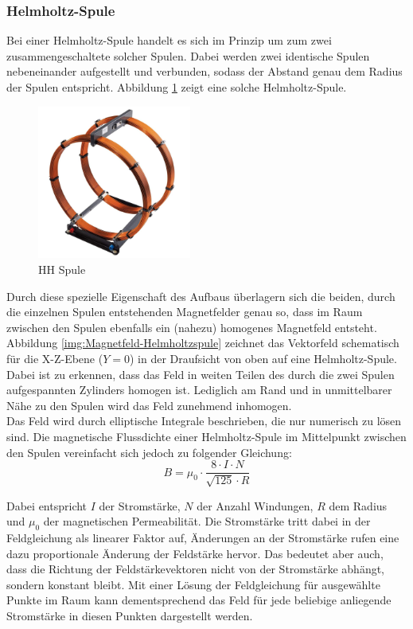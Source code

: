 \subsubsection{Helmholtz-Spule}
\label{sec-2-2-2}
Bei einer Helmholtz-Spule handelt es sich im Prinzip um zum zwei zusammengeschaltete solcher Spulen. Dabei werden zwei identische Spulen nebeneinander aufgestellt und verbunden, sodass der Abstand genau dem Radius der Spulen entspricht. Abbildung \ref{img:Helmholtz} zeigt eine solche Helmholtz-Spule.\\

\begin{figure}[h!]
	\centering
	\includegraphics[width=0.45\textwidth]{images/Helmholtz.jpg}
	\caption{HH Spule}
	\label{img:Helmholtz}
\end{figure}

Durch diese spezielle Eigenschaft des Aufbaus überlagern sich die beiden, durch die einzelnen Spulen entstehenden Magnetfelder genau so, dass im Raum zwischen den Spulen ebenfalls ein (nahezu) homogenes Magnetfeld entsteht. Abbildung \ref{img:Magnetfeld-Helmholtzspule} zeichnet das Vektorfeld schematisch für die X-Z-Ebene ($Y=0$) in der Draufsicht von oben auf eine Helmholtz-Spule. Dabei ist zu erkennen, dass das Feld in weiten Teilen des durch die zwei Spulen aufgespannten Zylinders homogen ist. Lediglich am Rand und in unmittelbarer Nähe zu den Spulen wird das Feld zunehmend inhomogen.\\

Das Feld wird durch elliptische Integrale beschrieben, die nur numerisch zu lösen sind.
Die magnetische Flussdichte einer Helmholtz-Spule im Mittelpunkt zwischen den Spulen vereinfacht sich jedoch zu folgender Gleichung:
\begin{equation}
	\label{eq:mfield}
	B = \mu_{0} \cdot \frac{8 \cdot I \cdot N}{\sqrt{125} \cdot R}
\end{equation}

Dabei entspricht $I$ der Stromstärke, $N$ der Anzahl Windungen, $R$ dem Radius und $\mu_{0}$ der magnetischen Permeabilität. Die Stromstärke tritt dabei in der Feldgleichung als linearer Faktor auf, Änderungen an der Stromstärke rufen eine dazu proportionale Änderung der Feldstärke hervor. Das bedeutet aber auch, dass die Richtung der Feldstärkevektoren nicht von der Stromstärke abhängt, sondern konstant bleibt. Mit einer Lösung der Feldgleichung für ausgewählte Punkte im Raum kann dementsprechend das Feld für jede beliebige anliegende Stromstärke in diesen Punkten dargestellt werden.\\

